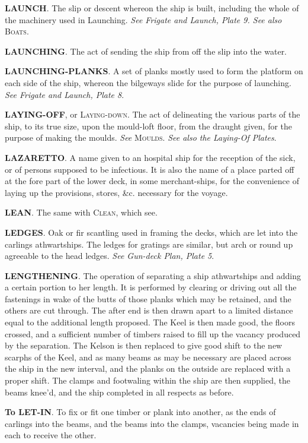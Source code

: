 \textbf{LAUNCH}. The slip or descent whereon the ship is built, including the whole of the machinery used in Launching. \textit{See Frigate and Launch, Plate 9. See also} \textsc{Boats}. 

\textbf{LAUNCHING}. The act of sending the ship from off the slip into the water. 

\textbf{LAUNCHING-PLANKS}. A set of planks mostly used to form the platform on each side of the ship, whereon the bilgeways slide for the purpose of launching. \textit{See Frigate and Launch, Plate 8}. 

\textbf{LAYING-OFF}, or \textsc{Laying-down}. The act of delineating the various parts of the ship, to its true size, upon the mould-loft floor, from the draught given, for the purpose of making the moulds. \textit{See} \textsc{Moulds}. \textit{See also the Laying-Of Plates}. 

\textbf{LAZARETTO}. A name given to an hospital ship for the reception of the sick, or of persons supposed to be infectious. It is also the name of a place parted off at the fore part of the lower deck, in some merchant-ships, for the convenience of laying up the provisions, stores, \&c. necessary for the voyage. 

\textbf{LEAN}. The same with \textsc{Clean}, which see. 

\textbf{LEDGES}. Oak or fir scantling used in framing the decks, which are let into the carlings athwartships. The ledges for gratings are similar, but arch or round up agreeable to the head ledges. \textit{See Gun-deck Plan, Plate 5}. 

\textbf{LENGTHENING}. The operation of separating a ship athwartships and adding a certain portion to her length. It is performed by clearing or driving out all the fastenings in wake of the butts of those planks which may be retained, and the others are cut through. The after end is then drawn apart to a limited distance equal to the additional length proposed. The Keel is then made good, the floors crossed, and a sufficient number of timbers raised to fill up the vacancy produced by the separation. The Kelson is then replaced to give good shift to the new scarphs of the Keel, and as many beams as may be necessary are placed across the ship in the new interval, and the planks on the outside are replaced with a proper shift. The clamps and footwaling within the ship are then supplied, the beams knee'd, and the ship completed in all respects as before.

\textbf{To LET-IN}. To fix or fit one timber or plank into another, as the ends of carlings into the beams, and the beams into the clamps, vacancies being made in each to receive the other. 

